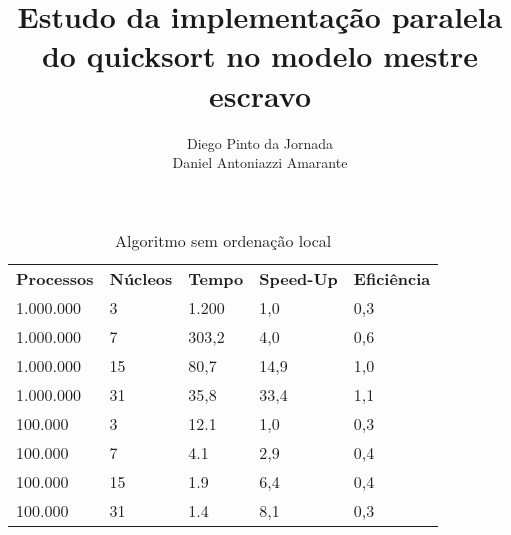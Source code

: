 \documentclass{acm_proc_article-sp}
\begin{document}
\makeatletter
\def\@copyrightspace{\relax}
\makeatother

\title{Estudo da implementação paralela do quicksort no modelo mestre escravo}

\author{\alignauthor Diego Pinto da Jornada\\
        \alignauthor Daniel Antoniazzi Amarante\\
}

\maketitle





\begin{table}[]
\centering
\caption{Algoritmo sem ordenação local}
\label{my-label}
\begin{tabular}{lllll}
\textbf{Processos} & \textbf{Núcleos} & \textbf{Tempo} & \textbf{Speed-Up} & \textbf{Eficiência} \\
1.000.000          & 3                & 1.200          & 1,0               & 0,3                 \\
1.000.000          & 7                & 303,2          & 4,0               & 0,6                 \\
1.000.000          & 15               & 80,7           & 14,9              & 1,0                 \\
1.000.000          & 31               & 35,8           & 33,4              & 1,1                 \\
100.000            & 3                & 12.1           & 1,0               & 0,3                 \\
100.000            & 7                & 4.1            & 2,9               & 0,4                 \\
100.000            & 15               & 1.9            & 6,4               & 0,4                 \\
100.000            & 31               & 1.4            & 8,1               & 0,3                
\end{tabular}
\end{table}
\end{document}
